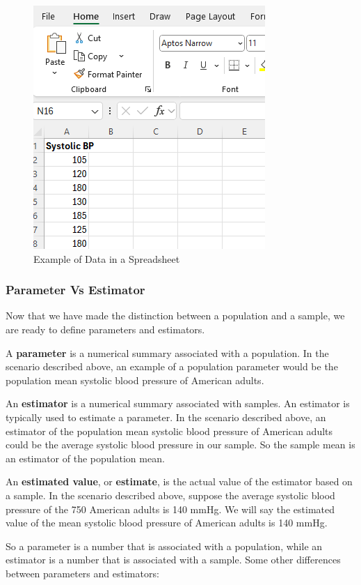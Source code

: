 \documentclass[
]{book}
\begin{document}
\begin{figure}
\centering
\includegraphics{images/07-dataframe.png}
\caption{\label{fig:07-dataframe}Example of Data in a Spreadsheet}
\end{figure}

\subsubsection{Parameter Vs Estimator}\label{parameter-vs-estimator}

Now that we have made the distinction between a population and a sample, we are ready to define parameters and estimators.

A \textbf{parameter} is a numerical summary associated with a population. In the scenario described above, an example of a population parameter would be the population mean systolic blood pressure of American adults.

An \textbf{estimator} is a numerical summary associated with samples. An estimator is typically used to estimate a parameter. In the scenario described above, an estimator of the population mean systolic blood pressure of American adults could be the average systolic blood pressure in our sample. So the sample mean is an estimator of the population mean.

An \textbf{estimated value}, or \textbf{estimate}, is the actual value of the estimator based on a sample. In the scenario described above, suppose the average systolic blood pressure of the 750 American adults is 140 mmHg. We will say the estimated value of the mean systolic blood pressure of American adults is 140 mmHg.

So a parameter is a number that is associated with a population, while an estimator is a number that is associated with a sample. Some other differences between parameters and estimators:
\end{document}
